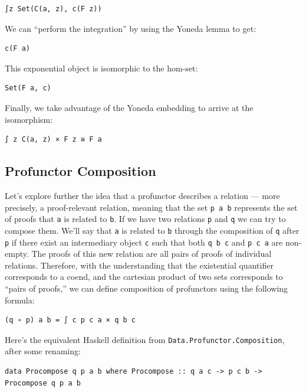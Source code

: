 \begin{verbatim}
∫z Set(C(a, z), c(F z))
\end{verbatim}

We can ``perform the integration'' by using the Yoneda lemma to get:

\begin{verbatim}
c(F a)
\end{verbatim}

This exponential object is isomorphic to the hom-set:

\begin{verbatim}
Set(F a, c)
\end{verbatim}

Finally, we take advantage of the Yoneda embedding to arrive at the
isomorphism:

\begin{verbatim}
∫ z C(a, z) × F z ≅ F a
\end{verbatim}

\subsection{Profunctor Composition}\label{profunctor-composition}

Let's explore further the idea that a profunctor describes a relation
--- more precisely, a proof-relevant relation, meaning that the set
\texttt{p\ a\ b} represents the set of proofs that \texttt{a} is related
to \texttt{b}. If we have two relations \texttt{p} and \texttt{q} we can
try to compose them. We'll say that \texttt{a} is related to \texttt{b}
through the composition of \texttt{q} after \texttt{p} if there exist an
intermediary object \texttt{c} such that both \texttt{q\ b\ c} and
\texttt{p\ c\ a} are non-empty. The proofs of this new relation are all
pairs of proofs of individual relations. Therefore, with the
understanding that the existential quantifier corresponds to a coend,
and the cartesian product of two sets corresponds to ``pairs of
proofs,'' we can define composition of profunctors using the following
formula:

\begin{verbatim}
(q ∘ p) a b = ∫ c p c a × q b c
\end{verbatim}

Here's the equivalent Haskell definition from
\texttt{Data.Profunctor.Composition}, after some renaming:

\begin{verbatim}
data Procompose q p a b where Procompose :: q a c -> p c b -> Procompose q p a b 
\end{verbatim}


